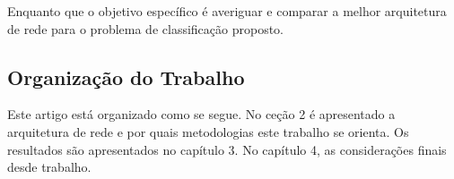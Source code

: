 Enquanto que o objetivo específico é averiguar e comparar a melhor arquitetura de rede para o problema de classificação proposto.


\subsection{Organização do Trabalho}

Este artigo está organizado como se segue. No ceção 2 é apresentado a arquitetura de rede e por quais metodologias este trabalho se orienta. Os resultados são apresentados no capítulo 3. No capítulo 4, as considerações finais desde trabalho.